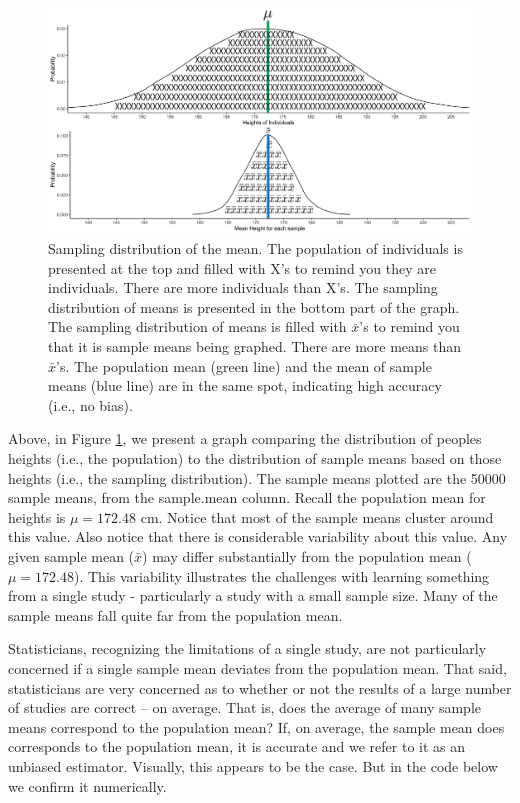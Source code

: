 \documentclass[
]{krantz}
\begin{document}
\begin{figure}
\includegraphics[width=0.8\linewidth]{ch_samples/images/sampling_dist} \caption[Sampling distribution of the mean.]{Sampling distribution of the mean. The population of individuals is presented at the top and filled with X's to remind you they are individuals. There are more individuals than X's. The sampling distribution of means is presented in the bottom part of the graph. The sampling distribution of means is filled with $\bar{x}$'s to remind you that it is sample means being graphed. There are more means than $\bar{x}$'s. The population mean (green line) and the mean of sample means (blue line) are in the same spot, indicating high accuracy (i.e., no bias).}\label{fig:bothdist}
\end{figure}

Above, in Figure \ref{fig:bothdist}, we present a graph comparing the distribution of peoples heights (i.e., the population) to the distribution of sample means based on those heights (i.e., the sampling distribution). The sample means plotted are the 50000 sample means, from the sample.mean column. Recall the population mean for heights is \(\mu = 172.48\) cm. Notice that most of the sample means cluster around this value. Also notice that there is considerable variability about this value. Any given sample mean (\(\bar{x}\)) may differ substantially from the population mean (\(\mu = 172.48\)). This variability illustrates the challenges with learning something from a single study - particularly a study with a small sample size. Many of the sample means fall quite far from the population mean.

Statisticians, recognizing the limitations of a single study, are not particularly concerned if a single sample mean deviates from the population mean. That said, statisticians are very concerned as to whether or not the results of a large number of studies are correct -- on average. That is, does the average of many sample means correspond to the population mean? If, on average, the sample mean does corresponds to the population mean, it is accurate and we refer to it as an unbiased estimator. Visually, this appears to be the case. But in the code below we confirm it numerically.
\end{document}
